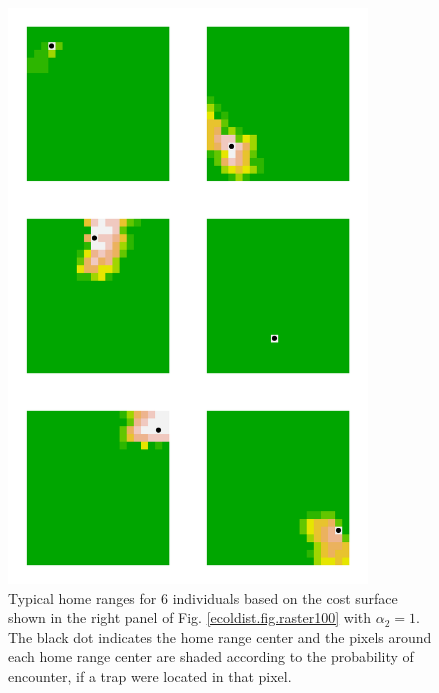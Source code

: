 \begin{figure}
\begin{center}
\includegraphics[height=6in,width=3.75in]{Ch10-EcolDist/figs/home_ranges}
\end{center}
\caption{
Typical home ranges for 6 individuals based on the cost surface shown in the right panel of 
  Fig. \ref{ecoldist.fig.raster100} with $\alpha_{2}=1$. The black dot indicates the home
  range center and the pixels around each home range center are shaded
according to the probability of encounter, if a trap were located in
that pixel.
}
\label{fig.homeranges}
\end{figure}

